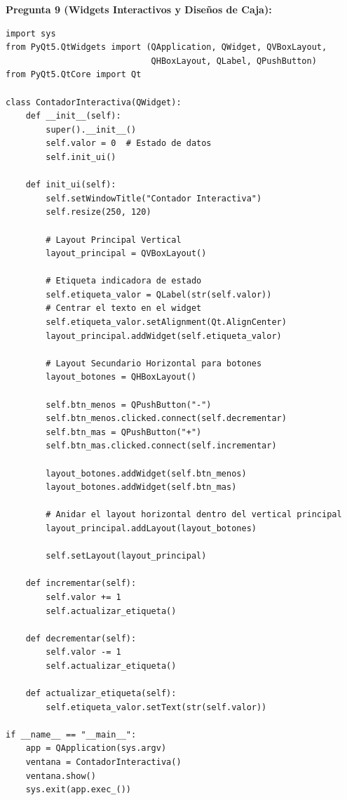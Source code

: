 \documentclass[12pt,letterpaper]{article}
\begin{document}
\pagebreak

\textbf{Pregunta 9 (Widgets Interactivos y Diseños de Caja):}
\begin{verbatim}
import sys
from PyQt5.QtWidgets import (QApplication, QWidget, QVBoxLayout, 
                             QHBoxLayout, QLabel, QPushButton)
from PyQt5.QtCore import Qt

class ContadorInteractiva(QWidget):
    def __init__(self):
        super().__init__()
        self.valor = 0  # Estado de datos
        self.init_ui()

    def init_ui(self):
        self.setWindowTitle("Contador Interactiva")
        self.resize(250, 120)

        # Layout Principal Vertical
        layout_principal = QVBoxLayout()

        # Etiqueta indicadora de estado
        self.etiqueta_valor = QLabel(str(self.valor))
        # Centrar el texto en el widget
        self.etiqueta_valor.setAlignment(Qt.AlignCenter)
        layout_principal.addWidget(self.etiqueta_valor)

        # Layout Secundario Horizontal para botones
        layout_botones = QHBoxLayout()

        self.btn_menos = QPushButton("-")
        self.btn_menos.clicked.connect(self.decrementar)
        self.btn_mas = QPushButton("+")
        self.btn_mas.clicked.connect(self.incrementar)

        layout_botones.addWidget(self.btn_menos)
        layout_botones.addWidget(self.btn_mas)

        # Anidar el layout horizontal dentro del vertical principal
        layout_principal.addLayout(layout_botones)

        self.setLayout(layout_principal)

    def incrementar(self):
        self.valor += 1
        self.actualizar_etiqueta()

    def decrementar(self):
        self.valor -= 1
        self.actualizar_etiqueta()

    def actualizar_etiqueta(self):
        self.etiqueta_valor.setText(str(self.valor))

if __name__ == "__main__":
    app = QApplication(sys.argv)
    ventana = ContadorInteractiva()
    ventana.show()
    sys.exit(app.exec_())
\end{verbatim}
\end{document}
